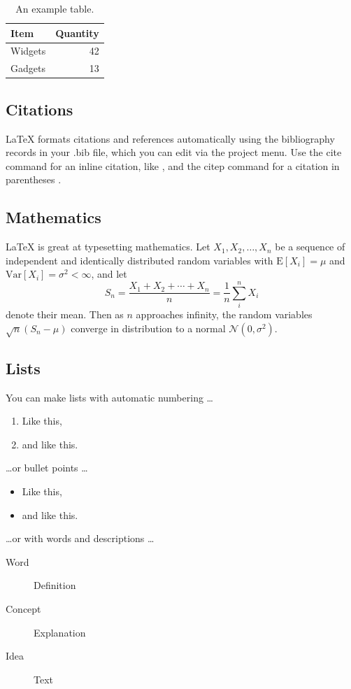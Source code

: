 \documentclass[fleqn,10pt,lineno]{wlpeerj}
\begin{document}
\begin{table}[ht]
\centering
\begin{tabular}{l|r}
Item & Quantity \\\hline
Widgets & 42 \\
Gadgets & 13
\end{tabular}
\caption{\label{tab:widgets}An example table.}
\end{table}

\subsection*{Citations}

LaTeX formats citations and references automatically using the bibliography records in your .bib file, which you can edit via the project menu. Use the cite command for an inline citation, like \cite{Figueredo:2009dg}, and the citep command for a citation in parentheses \citep{Figueredo:2009dg}.

\subsection*{Mathematics}

\LaTeX{} is great at typesetting mathematics. Let $X_1, X_2, \ldots, X_n$ be a sequence of independent and identically distributed random variables with $\text{E}[X_i] = \mu$ and $\text{Var}[X_i] = \sigma^2 < \infty$, and let
$$S_n = \frac{X_1 + X_2 + \cdots + X_n}{n}
      = \frac{1}{n}\sum_{i}^{n} X_i$$
denote their mean. Then as $n$ approaches infinity, the random variables $\sqrt{n}(S_n - \mu)$ converge in distribution to a normal $\mathcal{N}(0, \sigma^2)$.

\subsection*{Lists}

You can make lists with automatic numbering \dots

\begin{enumerate}[noitemsep] 
\item Like this,
\item and like this.
\end{enumerate}
\dots or bullet points \dots
\begin{itemize}[noitemsep] 
\item Like this,
\item and like this.
\end{itemize}
\dots or with words and descriptions \dots
\begin{description}
\item[Word] Definition
\item[Concept] Explanation
\item[Idea] Text
\end{description}
\end{document}
